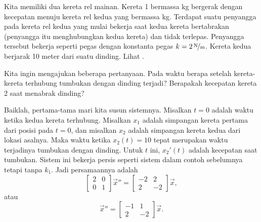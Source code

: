 \begin{example} \label{sosa:railcarexample}
Kita memiliki dua kereta rel
mainan.  Kereta 1 bermassa \unit[2]{kg} bergerak dengan kecepatan 
menuju kereta rel kedua
yang bermassa \unit[1]{kg}.  Terdapat suatu penyangga pada kereta rel kedua yang
mulai bekerja saat kedua kereta bertabrakan (penyangga itu menghubungkan kedua kereta)
dan tidak terlepas.
Penyangga tersebut bekerja seperti pegas dengan konstanta pegas $k=\unitfrac[2]{N}{m}$.
Kereta kedua
berjarak 10 meter dari suatu dinding.  Lihat .

\begin{myfig}
\capstart
{}
\caption{Tumbukan dua kereta rel.\label{sosa:railcarscrashfig}}
\end{myfig}

Kita ingin mengajukan beberapa pertanyaan.  Pada waktu berapa setelah kereta-kereta terhubung
tumbukan dengan dinding terjadi?  Berapakah kecepatan kereta 2 saat menabrak
dinding?

Baiklah\@, pertama-tama mari kita susun sistemnya.  Misalkan $t=0$ adalah waktu
ketika kedua kereta terhubung.  Misalkan $x_1$ adalah simpangan kereta pertama
dari posisi pada $t=0$, dan misalkan $x_2$ adalah
simpangan kereta kedua dari lokasi asalnya.  Maka
waktu ketika $x_2(t) = 10$ tepat merupakan waktu terjadinya tumbukan dengan dinding.
Untuk $t$ ini, $x_2'(t)$ adalah kecepatan saat tumbukan.  Sistem ini bekerja persis seperti
sistem dalam contoh sebelumnya tetapi tanpa $k_1$.  Jadi persamaannya adalah
\begin{equation*}
\begin{bmatrix}
2 & 0 \\
0 & 1
\end{bmatrix}
{\vec{x}}'' =
\begin{bmatrix}
-2 & 2 \\
2 & -2
\end{bmatrix}
\vec{x} ,
\end{equation*}
atau
\begin{equation*}
{\vec{x}}'' =
\begin{bmatrix}
-1 & 1 \\
2 & -2
\end{bmatrix}
\vec{x} .
\end{equation*}


\end{example}
